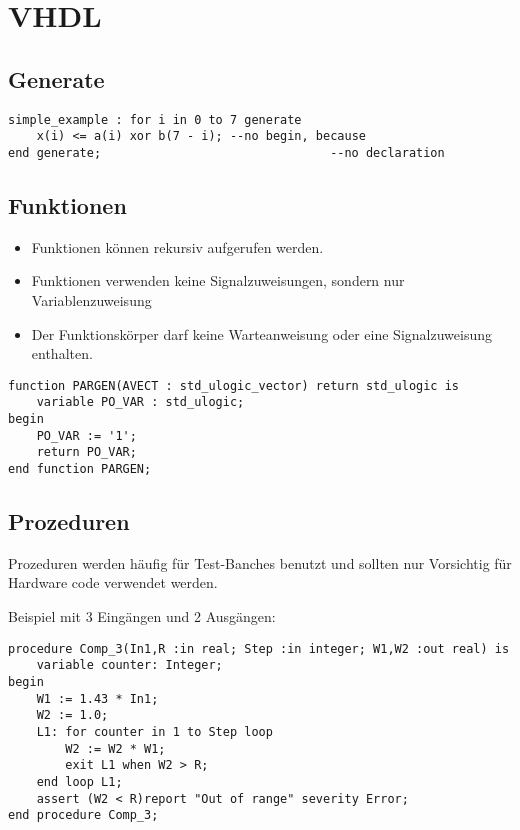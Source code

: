 \section{VHDL}


\subsection{Generate}
\begin{lstlisting}
simple_example : for i in 0 to 7 generate
	x(i) <= a(i) xor b(7 - i); --no begin, because 
end generate;								 --no declaration
\end{lstlisting}
\vspace{-30pt}

\subsection{Funktionen}
\begin{itemize}[itemsep=-4pt]
	\item Funktionen können rekursiv aufgerufen werden.
	\item Funktionen verwenden keine Signalzuweisungen, sondern nur Variablenzuweisung
	\item Der Funktionskörper darf keine Warteanweisung oder eine Signalzuweisung enthalten.
\end{itemize}

\begin{lstlisting}
function PARGEN(AVECT : std_ulogic_vector) return std_ulogic is
	variable PO_VAR : std_ulogic;
begin
	PO_VAR := '1';
	return PO_VAR;
end function PARGEN;
\end{lstlisting}
\vspace{-30pt}

\subsection{Prozeduren}
Prozeduren werden häufig für Test-Banches benutzt und sollten nur Vorsichtig für Hardware code verwendet werden.

Beispiel mit 3 Eingängen und 2 Ausgängen:
\begin{lstlisting}
procedure Comp_3(In1,R :in real; Step :in integer; W1,W2 :out real) is
	variable counter: Integer;
begin
	W1 := 1.43 * In1;
	W2 := 1.0;
	L1: for counter in 1 to Step loop
		W2 := W2 * W1;
		exit L1 when W2 > R;
	end loop L1;
	assert (W2 < R)report "Out of range" severity Error;
end procedure Comp_3;
\end{lstlisting}
\vspace{-30pt}

